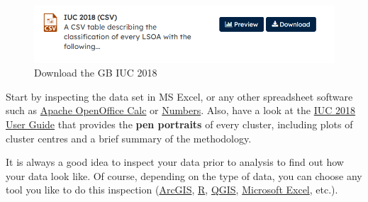 \documentclass[
  letterpaper,
  DIV=11,
  numbers=noendperiod]{scrreprt}
\begin{document}
\begin{figure}

{\centering \includegraphics[width=1\textwidth,height=\textheight]{images/w07/iuc-download.png}

}

\caption{\label{fig-geo-iuc-download}Download the GB IUC 2018}

\end{figure}

Start by inspecting the data set in MS Excel, or any other spreadsheet
software such as
\href{https://www.openoffice.org/product/calc.html}{Apache OpenOffice
Calc} or \href{https://www.apple.com/uk/numbers/}{Numbers}. Also, have a
look at the
\href{https://data.cdrc.ac.uk/system/files/iuc2018userguide.pdf}{IUC
2018 User Guide} that provides the \textbf{pen portraits} of every
cluster, including plots of cluster centres and a brief summary of the
methodology.

\begin{tcolorbox}[enhanced jigsaw, rightrule=.15mm, colback=white, opacityback=0, opacitybacktitle=0.6, coltitle=black, colbacktitle=quarto-callout-tip-color!10!white, breakable, arc=.35mm, title=\textcolor{quarto-callout-tip-color}{\faLightbulb}\hspace{0.5em}{Tip}, left=2mm, leftrule=.75mm, bottomtitle=1mm, toprule=.15mm, bottomrule=.15mm, colframe=quarto-callout-tip-color-frame, toptitle=1mm, titlerule=0mm]

It is always a good idea to inspect your data prior to analysis to find
out how your data look like. Of course, depending on the type of data,
you can choose any tool you like to do this inspection
(\href{https://www.arcgis.com/index.html}{ArcGIS},
\href{https://www.r-project.org/}{R},
\href{https://qgis.org/en/site/}{QGIS},
\href{https://www.office.com/}{Microsoft Excel}, etc.).

\end{tcolorbox}
\end{document}
